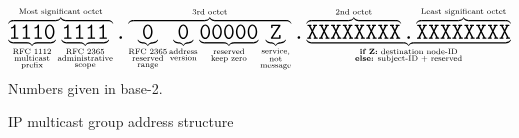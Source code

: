 \begin{figure}[H]
    \centering
    $$
    \overbrace{
        \underbrace{
            \texttt{\huge{1110}}
        }_{\substack{\text{RFC~1112} \\ \text{multicast} \\ \text{prefix}}}%
        \underbrace{
            \texttt{\huge{1111}}
        }_{\substack{\text{RFC~2365} \\ \text{administrative} \\ \text{scope}}}%
    }^{\text{Most significant octet}}%
    \texttt{\huge{.}}%
    \overbrace{
        \underbrace{
            \texttt{\huge{0}}
        }_{\substack{\text{RFC~2365} \\ \text{reserved} \\ \text{range}}}%
        \underbrace{
            \texttt{\huge{0}}
        }_{\substack{\text{address} \\ \text{version}}}%
        \underbrace{
            \texttt{\huge{00000}}
        }_{\substack{\text{reserved} \\ \text{keep zero}}}%
        \underbrace{
            \texttt{\huge{Z}}
        }_{\substack{\text{service,} \\ \text{not} \\ \text{message}}}%
    }^{\text{3rd octet}}%
    \texttt{\huge{.}}%
    \underbrace{
        \overbrace{\texttt{\huge{XXXXXXXX}}}^{\text{2nd octet}}
        \texttt{\huge{.}}
        \overbrace{\texttt{\huge{XXXXXXXX}}}^{\text{Least significant octet}}
    }_{\substack{\text{\textbf{if Z:} destination node-ID} \\ \text{\textbf{else:} subject-ID + reserved}}}%
    $$
    Numbers given in base-2.
    \caption{IP multicast group address structure\label{fig:transport_udp_multicast_group_address}}
\end{figure}


